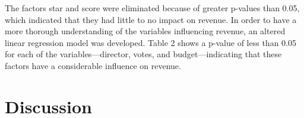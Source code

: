 \documentclass[12pt]{article}
\begin{document}
The factors star and score were eliminated because of greater p-values than 0.05, which indicated that they had little to no impact on revenue. In order to have a more thorough understanding of the variables influencing revenue, an altered linear regression model was developed. Table 2 shows a p-value of less than 0.05 for each of the variables—director, votes, and budget—indicating that these factors have a considerable influence on revenue.


\section{Discussion}
\label{sec:dis}





\end{document}
